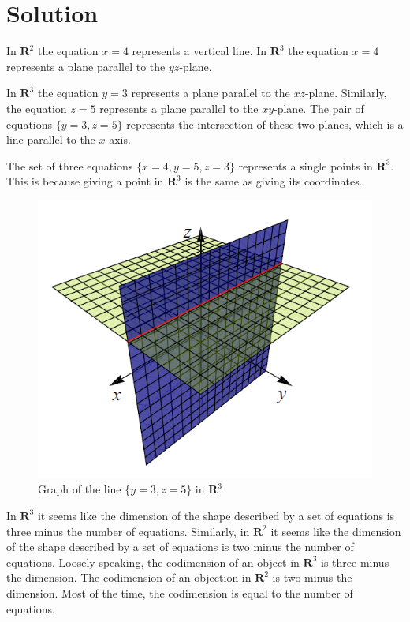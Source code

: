 \documentclass[11pt]{article}
\renewcommand{\R}{\mathbf{R}}
\begin{document}
\section*{Solution}
\begin{enum}{\alph}
\item In $\R^2$ the equation $x=4$ represents a vertical line. In $\R^3$ the equation $x=4$ represents a plane parallel to the $yz$-plane.

\item In $\R^3$ the equation $y=3$ represents a plane parallel to the $xz$-plane. Similarly, the equation $z=5$ represents a plane parallel to the $xy$-plane. The pair of equations $\{y=3,z=5\}$ represents the intersection of these two planes, which is a line parallel to the $x$-axis.

\item The set of three equations $\{x=4,y=5,z=3\}$ represents a single points in $\R^3$. This is because giving a point in $\R^3$ is the same as giving its coordinates.

\begin{figure}[ht]
\centering
\includegraphics[scale=.5]{basic_plane_intersection}
\caption{Graph of the line $\{y=3,z=5\}$ in $\R^3$}
\end{figure}

\item In $\R^3$ it seems like the dimension of the shape described by a set of equations is three minus the number of equations. Similarly, in $\R^2$ it seems like the dimension of the shape described by a set of equations is two minus the number of equations. Loosely speaking, the codimension of an object in $\R^3$ is three minus the dimension. The codimension of an objection in $\R^2$ is two minus the dimension. Most of the time, the codimension is equal to the number of equations.
\end{enum}
\end{document}
